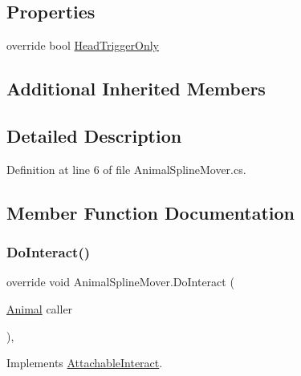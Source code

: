 \subsection*{Properties}
\begin{DoxyCompactItemize}
\item 
override bool \mbox{\hyperlink{class_animal_spline_mover_a8bf1f2543567617776083659d8710e8e}{Head\+Trigger\+Only}}
\end{DoxyCompactItemize}
\subsection*{Additional Inherited Members}


\subsection{Detailed Description}


Definition at line 6 of file Animal\+Spline\+Mover.\+cs.



\subsection{Member Function Documentation}
\mbox{\label{class_animal_spline_mover_aa8555455eae08f3834a1cafb97a21c36}} 
\subsubsection{\texorpdfstring{Do\+Interact()}{DoInteract()}}
{\footnotesize\ttfamily override void Animal\+Spline\+Mover.\+Do\+Interact (\begin{DoxyParamCaption}\item[{\mbox{\hyperlink{class_animal}{Animal}}}]{caller }\end{DoxyParamCaption})\hspace{0.3cm}{\ttfamily [protected]}, {\ttfamily [virtual]}}



Implements \mbox{\hyperlink{class_attachable_interact_a9b07a54f1dbb96777c4bd287dfe438e3}{Attachable\+Interact}}.



